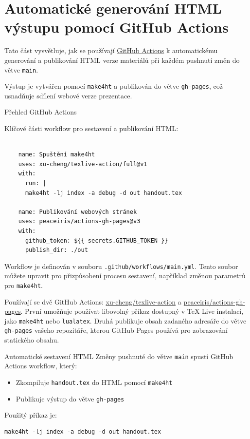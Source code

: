 \section{Automatické generování HTML výstupu pomocí GitHub Actions}

Tato část vysvětluje, jak se používají
\href{https://docs.github.com/en/actions/writing-workflows/quickstart}{GitHub
Actions} k automatickému generování a publikování HTML verze materiálů při
každém pushnutí změn do větve \texttt{main}.

Výstup je vytvářen pomocí \texttt{make4ht} a publikován do větve \texttt{gh-pages}, což usnadňuje sdílení webové verze prezentace.

\begin{frame}[fragile]{Přehled GitHub Actions}

  \begin{block}{Klíčové části workflow pro sestavení a publikování HTML:}

\begin{verbatim}

    name: Spuštění make4ht
    uses: xu-cheng/texlive-action/full@v1
    with:
      run: |
      make4ht -lj index -a debug -d out handout.tex

    name: Publikování webových stránek
    uses: peaceiris/actions-gh-pages@v3
    with:
      github_token: ${{ secrets.GITHUB_TOKEN }}
      publish_dir: ./out
\end{verbatim}
\end{block}

\end{frame}

Workflow je definován v souboru \texttt{.github/workflows/main.yml}.
Tento soubor můžete upravit pro přizpůsobení procesu sestavení, například změnou parametrů pro \texttt{make4ht}.

Používají se dvě GitHub Actions: \href{https://github.com/xu-cheng/texlive-action}{xu-cheng/texlive-action}
a \href{https://github.com/peaceiris/actions-gh-pages}{peaceiris/actions-gh-pages}.
První umožňuje používat libovolný příkaz dostupný v TeX Live instalaci, jako \texttt{make4ht} nebo \texttt{lualatex}.
Druhá publikuje obsah zadaného adresáře do větve \texttt{gh-pages} vašeho repozitáře,
kterou GitHub Pages používá pro zobrazování statického obsahu.

\begin{frame}[fragile]{Automatické sestavení HTML}
Změny pushnuté do větve \texttt{main} spustí GitHub Actions workflow, který:

\begin{itemize}
\item Zkompiluje \texttt{handout.tex} do HTML pomocí \texttt{make4ht}
\item Publikuje výstup do větve \texttt{gh-pages}
\end{itemize}

Použitý příkaz je:

\begin{verbatim}
make4ht -lj index -a debug -d out handout.tex
\end{verbatim}
\end{frame}

